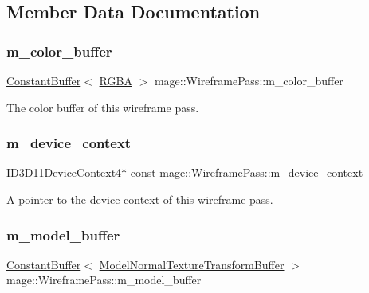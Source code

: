 \subsection{Member Data Documentation}
\hypertarget{classmage_1_1_wireframe_pass_acb2aaf33841a4f08edb50f9b72637d93}{}\label{classmage_1_1_wireframe_pass_acb2aaf33841a4f08edb50f9b72637d93} 
\subsubsection{\texorpdfstring{m\+\_\+color\+\_\+buffer}{m\_color\_buffer}}
{\footnotesize\ttfamily \hyperlink{classmage_1_1_constant_buffer}{Constant\+Buffer}$<$ \hyperlink{structmage_1_1_r_g_b_a}{R\+G\+BA} $>$ mage\+::\+Wireframe\+Pass\+::m\+\_\+color\+\_\+buffer\hspace{0.3cm}{\ttfamily [private]}}

The color buffer of this wireframe pass. \hypertarget{classmage_1_1_wireframe_pass_ac0f6bc1488ab515fe00d6e7abf230636}{}\label{classmage_1_1_wireframe_pass_ac0f6bc1488ab515fe00d6e7abf230636} 
\subsubsection{\texorpdfstring{m\+\_\+device\+\_\+context}{m\_device\_context}}
{\footnotesize\ttfamily I\+D3\+D11\+Device\+Context4$\ast$ const mage\+::\+Wireframe\+Pass\+::m\+\_\+device\+\_\+context\hspace{0.3cm}{\ttfamily [private]}}

A pointer to the device context of this wireframe pass. \hypertarget{classmage_1_1_wireframe_pass_aa7fb7cbba08fe8b4d7defab36d2e82a7}{}\label{classmage_1_1_wireframe_pass_aa7fb7cbba08fe8b4d7defab36d2e82a7} 
\subsubsection{\texorpdfstring{m\+\_\+model\+\_\+buffer}{m\_model\_buffer}}
{\footnotesize\ttfamily \hyperlink{classmage_1_1_constant_buffer}{Constant\+Buffer}$<$ \hyperlink{structmage_1_1_model_normal_texture_transform_buffer}{Model\+Normal\+Texture\+Transform\+Buffer} $>$ mage\+::\+Wireframe\+Pass\+::m\+\_\+model\+\_\+buffer\hspace{0.3cm}{\ttfamily [private]}}

